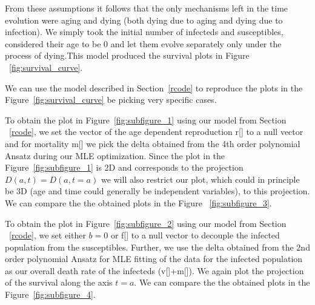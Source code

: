 \documentclass[10pt]{article}         %
\begin{document}
From these assumptions it follows that the only mechanisms left in the time evolution were aging and dying (both dying due to aging and dying due to infection). We simply took the initial number of infecteds and susceptibles, considered their age to be 0 and let them evolve separately only under the process of dying.This model produced the survival plots in Figure ~\ref{fig:survival_curve}.

We can use the model described in Section~\ref{rcode} to reproduce the plots in the Figure~\ref{fig:survival_curve} be picking very specific cases. 

To obtain the plot in Figure~\ref{fig:subfigure_1} using our model from Section ~\ref{rcode}, we set the vector of the age dependent reproduction r[] to a null vector and for mortality m[] we pick the delta obtained from the 4th order polynomial Ansatz during our MLE optimization. Since the plot in the Figure~\ref{fig:subfigure_1} is 2D and corresponds to the projection $D(a,t)=D(a,t=a)$ we will also restrict our plot, which could in principle be 3D (age and time could generally be independent variables), to this projection. We can compare the the obtained plots in the Figure ~\ref{fig:subfigure_3}. 

To obtain the plot in Figure~\ref{fig:subfigure_2} using our model from Section ~\ref{rcode}, we set either $b=0$ or f[] to a null vector to decouple the infected population from the susceptibles. Further, we use the delta obtained from the 2nd order polynomial Ansatz for MLE fitting of the data for the infected population as our overall death rate of the infecteds (v[]+m[]). We again plot the projection of the survival along the axis $t=a$. We can compare the the obtained plots in the Figure~\ref{fig:subfigure_4}. 
\end{document}
